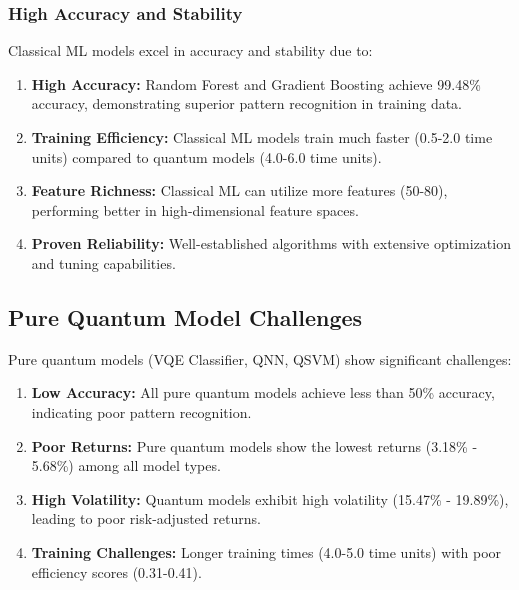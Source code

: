 \documentclass[12pt,a4paper]{article}
\begin{document}
\subsubsection{High Accuracy and Stability}

Classical ML models excel in accuracy and stability due to:

\begin{enumerate}
    \item \textbf{High Accuracy:} Random Forest and Gradient Boosting achieve 99.48\% accuracy, demonstrating superior pattern recognition in training data.
    
    \item \textbf{Training Efficiency:} Classical ML models train much faster (0.5-2.0 time units) compared to quantum models (4.0-6.0 time units).
    
    \item \textbf{Feature Richness:} Classical ML can utilize more features (50-80), performing better in high-dimensional feature spaces.
    
    \item \textbf{Proven Reliability:} Well-established algorithms with extensive optimization and tuning capabilities.
\end{enumerate}

\subsection{Pure Quantum Model Challenges}

Pure quantum models (VQE Classifier, QNN, QSVM) show significant challenges:

\begin{enumerate}
    \item \textbf{Low Accuracy:} All pure quantum models achieve less than 50\% accuracy, indicating poor pattern recognition.
    
    \item \textbf{Poor Returns:} Pure quantum models show the lowest returns (3.18\% - 5.68\%) among all model types.
    
    \item \textbf{High Volatility:} Quantum models exhibit high volatility (15.47\% - 19.89\%), leading to poor risk-adjusted returns.
    
    \item \textbf{Training Challenges:} Longer training times (4.0-5.0 time units) with poor efficiency scores (0.31-0.41).
\end{enumerate}
\end{document}
